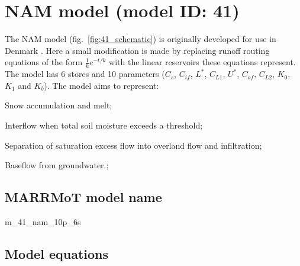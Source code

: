 \section{NAM model (model ID: 41)}
The NAM model (fig.~\ref{fig:41_schematic}) is originally developed for use in Denmark \citep{Nielsen1973}. Here a small modification is made by replacing runoff routing equations of the form $\frac{1}{k}e^{-t/k}$ with the linear reservoirs these equations represent. The model has 6 stores and 10 parameters ($C_s$, $C_{if}$, $L^*$, $C_{L1}$, $U^*$, $C_{of}$, $C_{L2}$, $K_0$, $K_1$ and $K_b$). The model aims to represent:

\begin{itemizecompact}
\item Snow accumulation and melt;
\item Interflow when total soil moisture exceeds a threshold;
\item Separation of saturation excess flow into overland flow and infiltration;
\item Baseflow from groundwater.;
\end{itemizecompact}

\subsection{MARRMoT model name}
m\_41\_nam\_10p\_6s \\

\subsection{Model equations}

